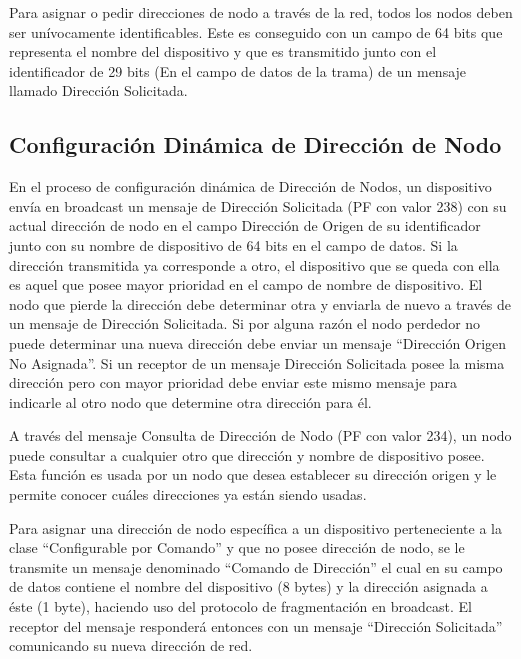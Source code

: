 Para asignar o pedir direcciones de nodo a través de la red, todos los nodos deben ser unívocamente identificables. Este es conseguido con un campo de 64 bits que representa el nombre del dispositivo y que es transmitido junto con el identificador de 29 bits (En el campo de datos de la trama) de un mensaje llamado Dirección Solicitada. 



\subsection{Configuración Dinámica de Dirección de Nodo}
En el proceso de configuración dinámica de Dirección de Nodos, un dispositivo envía en broadcast un mensaje  de Dirección Solicitada (PF con valor 238) con su actual dirección de nodo en el campo Dirección de Origen de su identificador junto con su nombre de dispositivo de 64 bits en el campo de datos. Si la dirección transmitida ya corresponde a otro, el dispositivo que se queda con ella es aquel que posee mayor prioridad en el campo de nombre de dispositivo. El nodo que pierde la dirección debe determinar otra y enviarla de nuevo a través de un mensaje de Dirección Solicitada. Si por alguna razón el nodo perdedor no puede determinar una nueva dirección debe enviar un mensaje “Dirección Origen No Asignada”. Si un receptor de un mensaje Dirección Solicitada posee la misma dirección pero con mayor prioridad debe enviar este mismo mensaje para indicarle al otro nodo que determine otra dirección para él.

A través del mensaje Consulta de Dirección de Nodo (PF con valor 234), un nodo puede consultar a cualquier otro que dirección y nombre de dispositivo posee. Esta función es usada por un nodo que desea establecer su dirección origen y le permite conocer cuáles direcciones ya están siendo usadas. 

Para asignar una dirección de nodo específica a un dispositivo perteneciente a la clase “Configurable por Comando” y que no posee dirección de nodo, se le transmite un mensaje denominado “Comando de Dirección” el cual en su campo de datos contiene el nombre del dispositivo (8 bytes) y la dirección asignada a éste (1 byte), haciendo uso del protocolo de fragmentación en broadcast. El receptor del mensaje responderá entonces con un mensaje “Dirección Solicitada” comunicando su nueva dirección de red.

